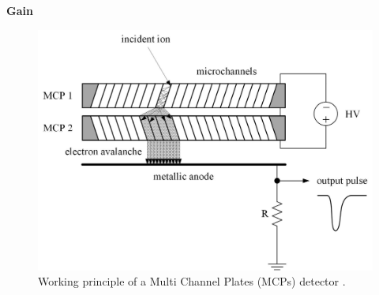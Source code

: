 		\textbf{Gain}\\
		\begin{figure}[h] %
			\centering
			\includegraphics[width=.7\textwidth]{Bilder/MCP_PrinipleSchema.jpg}
			\caption{Working principle of a Multi Channel Plates (MCPs) detector \cite{Wiza_1979_MCP,Diss_Meyer}.}
			\label{fig:MCPPrincipleSchema}
		\end{figure}
		
